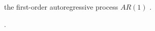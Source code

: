 \documentclass[
thesis.tex
]{subfiles}
\begin{document}
\begin{definition}
	the first-order autoregressive process $AR(1)$ \cite[Lecture 5, p.4]{solis-garcia_ucb_2022}.
\end{definition}

\begin{definition}
	\cite[Hands on 5, p.14]{solis-garcia_ucb_2022}.
\end{definition}














\end{document}
